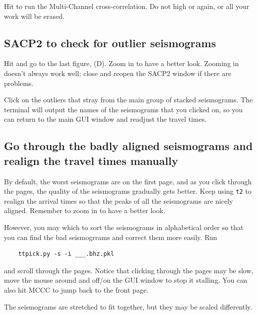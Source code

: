 \documentclass[letterpaper,10pt]{article}
\begin{document}
Hit  to run the Multi-Channel cross-correlation. Do not high  or  again, or all your work will be erased. 


\subsection{SACP2 to check for outlier seismograms}

Hit  and go to the last figure, (D). Zoom in to have a better look. Zooming in doesn't always work well; close and reopen the SACP2 window if there are problems. 

Click on the outliers that stray from the main group of stacked seismograms. The terminal will output the names of the seismograms that you clicked on, so you can return to the main GUI window and readjust the travel times.


\subsection{Go through the badly aligned seismograms and realign the travel times manually}

By default, the worst seismograms are on the first page, and as you click through the pages, the quality of the seismograms gradually gets better. Keep using \texttt{t2} to realign the arrival times so that the peaks of all the seismograms are nicely aligned. Remember to zoom in to have a better look. 

However, you may which to sort the seismograms in alphabetical order so that you can find the bad seismogrrams and correct them more easily. Run 


\begin{verbatim}
	ttpick.py -s -i ___.bhz.pkl
\end{verbatim}

and scroll through the pages. Notice that clicking through the pages may be slow, move the mouse around and off/on the GUI window to stop it stalling. You can also hit MCCC to jump back to the front page. 

The seismograms are stretched to fit together, but they may be scaled differently. 

\end{document}
